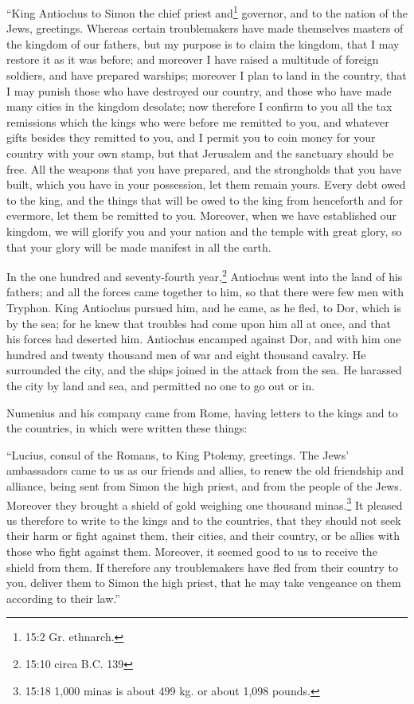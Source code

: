 ``King Antiochus to Simon the chief priest and\footnote{15:2 Gr.
  ethnarch.} governor, and to the nation of the Jews, greetings.
 Whereas certain troublemakers have made themselves masters
of the kingdom of our fathers, but my purpose is to claim the kingdom,
that I may restore it as it was before; and moreover I have raised a
multitude of foreign soldiers, and have prepared warships; 
moreover I plan to land in the country, that I may punish those who have
destroyed our country, and those who have made many cities in the
kingdom desolate;  now therefore I confirm to you all the
tax remissions which the kings who were before me remitted to you, and
whatever gifts besides they remitted to you,  and I permit
you to coin money for your country with your own stamp,  but
that Jerusalem and the sanctuary should be free. All the weapons that
you have prepared, and the strongholds that you have built, which you
have in your possession, let them remain yours.  Every debt
owed to the king, and the things that will be owed to the king from
henceforth and for evermore, let them be remitted to you. 
Moreover, when we have established our kingdom, we will glorify you and
your nation and the temple with great glory, so that your glory will be
made manifest in all the earth.

 In the one hundred and seventy-fourth year,\footnote{15:10
  circa B.C. 139} Antiochus went into the land of his fathers; and all
the forces came together to him, so that there were few men with
Tryphon.  King Antiochus pursued him, and he came, as he
fled, to Dor, which is by the sea;  for he knew that
troubles had come upon him all at once, and that his forces had deserted
him.  Antiochus encamped against Dor, and with him one
hundred and twenty thousand men of war and eight thousand cavalry.
 He surrounded the city, and the ships joined in the attack
from the sea. He harassed the city by land and sea, and permitted no one
to go out or in.

 Numenius and his company came from Rome, having letters to
the kings and to the countries, in which were written these things:

 ``Lucius, consul of the Romans, to King Ptolemy,
greetings.  The Jews' ambassadors came to us as our friends
and allies, to renew the old friendship and alliance, being sent from
Simon the high priest, and from the people of the Jews. 
Moreover they brought a shield of gold weighing one thousand
minas.\footnote{15:18 1,000 minas is about 499 kg. or about 1,098
  pounds.}  It pleased us therefore to write to the kings
and to the countries, that they should not seek their harm or fight
against them, their cities, and their country, or be allies with those
who fight against them.  Moreover, it seemed good to us to
receive the shield from them.  If therefore any
troublemakers have fled from their country to you, deliver them to Simon
the high priest, that he may take vengeance on them according to their
law.''

